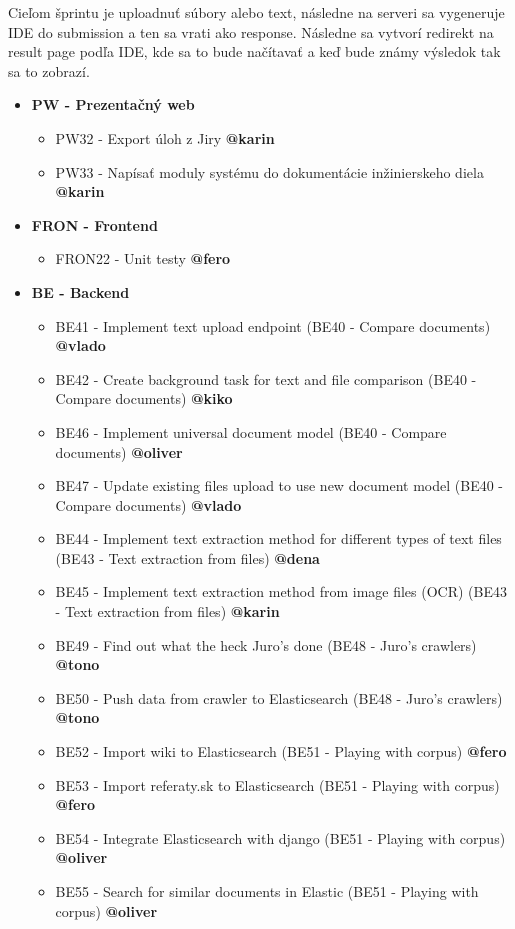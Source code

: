 \documentclass{article}
\begin{document}
    \textnormal {Cieľom šprintu je uploadnuť súbory alebo text, následne na serveri sa vygeneruje IDE do submission a ten sa vrati ako response. Následne sa vytvorí redirekt na result page podľa IDE, kde sa to bude načítavať a keď bude známy výsledok tak sa to zobrazí.}

    \begin{itemize}
    \item \textbf {PW - Prezentačný web} 
        \begin{itemize}
            \item PW32 - Export úloh z Jiry \textbf {@karin}
            \item PW33 - Napísať moduly systému do dokumentácie inžinierskeho diela \textbf {@karin}
        \end{itemize}
    \item \textbf {FRON - Frontend} 
        \begin{itemize}
            \item FRON22 - Unit testy \textbf {@fero}
        \end{itemize}  
    \item \textbf {BE - Backend} 
        \begin{itemize}
            \item BE41 - Implement text upload endpoint (BE40 - Compare documents) \textbf {@vlado}
            \item BE42 - Create background task for text and file comparison (BE40 - Compare documents) \textbf {@kiko}
            \item BE46 - Implement universal document model (BE40 - Compare documents) \textbf {@oliver}
            \item BE47 - Update existing files upload to use new document model (BE40 - Compare documents) \textbf {@vlado}
            \item BE44 - Implement text extraction method for different types of text files (BE43 - Text extraction from files) \textbf {@dena}
            \item BE45 - Implement text extraction method from image files (OCR) (BE43 - Text extraction from files) \textbf {@karin}
            \item BE49 - Find out what the heck Juro's done (BE48 - Juro's crawlers) \textbf {@tono}
            \item BE50 - Push data from crawler to Elasticsearch (BE48 - Juro's crawlers) \textbf {@tono}
            \item BE52 - Import wiki to Elasticsearch (BE51 - Playing with corpus) \textbf {@fero}
            \item BE53 - Import referaty.sk to Elasticsearch (BE51 - Playing with corpus) \textbf {@fero}
            \item BE54 - Integrate Elasticsearch with django (BE51 - Playing with corpus) \textbf {@oliver}
            \item BE55 - Search for similar documents in Elastic (BE51 - Playing with corpus) \textbf {@oliver}
        \end{itemize}        
    \end{itemize}
\end{document}
